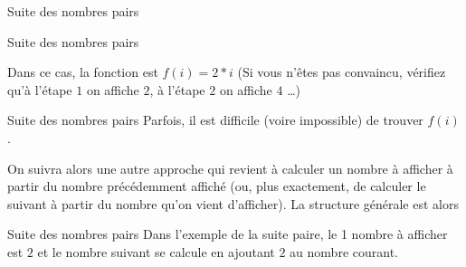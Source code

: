 \begin{frame}{Suite des nombres pairs}
\end{frame}

\begin{frame}{Suite des nombres pairs}

	Dans ce cas, la fonction est $f(i)=2*i$
	(Si vous n'êtes pas convaincu, vérifiez qu'à l'étape $1$ on affiche $2$,
	à l'étape $2$ on affiche $4$ \dots)
	
	\bigskip

\end{frame}

\begin{frame}{Suite des nombres pairs}
	Parfois, il est difficile (voire impossible) de trouver $f(i)$.
	
	\bigskip
	
	On suivra alors une autre approche qui revient à calculer un nombre
	à afficher à partir du nombre précédemment affiché
	(ou, plus exactement, de calculer le suivant à partir du nombre
	qu'on vient d'afficher).
	La structure générale est alors

	\bigskip
	
\end{frame}

\begin{frame}{Suite des nombres pairs}
	Dans l'exemple de la suite paire, le 1 nombre à afficher est $2$
	et le nombre suivant se calcule en ajoutant $2$ au nombre courant.

	\bigskip
	
\end{frame}

